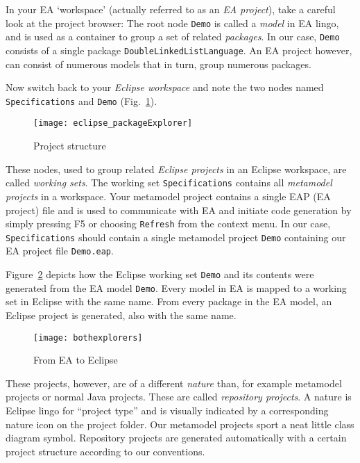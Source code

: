 In your EA `workspace' (actually referred to as an \emph{EA project}), take a careful  look at the project browser:  The root node \texttt{Demo} is called a
\emph{model} in EA lingo, and is used as a container to group a set of related \emph{packages}. In our case, \texttt{Demo}  consists of a single package
\texttt{DoubleLinkedListLanguage}. An EA project however, can consist of numerous models that in turn, group numerous packages.

Now switch back to your \emph{Eclipse workspace} and note the two nodes named \texttt{Spe\-ci\-fi\-ca\-tions} and \texttt{Demo} (Fig.~\ref{fig_eclipsePS}).

\begin{figure}[htbp]
    \centering
    \texttt{[image: eclipse\_packageExplorer]}
    \caption{Project structure}
    \label{fig_eclipsePS}
 \end{figure}


These nodes, used to group related \emph{Eclipse projects} in an Eclipse workspace, are called \emph{working sets}. The working set
\texttt{Spe\-ci\-fi\-ca\-tions} contains all \emph{metamodel projects} in a  workspace. Your metamodel project contains a single EAP (EA project) file and is
used to communicate with EA and initiate code generation by simply pressing F5 or choosing \texttt{Refresh} from the context menu.
In our case, \texttt{Specifications} should contain a single metamodel project \texttt{Demo} containing our EA project file  \texttt{Demo.eap}.
 
Figure~\ref{fig_fromEAtoEclipse} depicts how the Eclipse working set \texttt{Demo} and its contents were generated from the EA model \texttt{Demo}. Every model
in EA is mapped to a working set in Eclipse with the same name. From every package in the EA model, an Eclipse project is generated, also with the same name.

\begin{figure}[htbp]
    \centering
  \texttt{[image: bothexplorers]}
    \caption{From EA to Eclipse}
    \label{fig_fromEAtoEclipse}
\end{figure}

These projects, however, are of a different \emph{nature} than, for example metamodel projects or normal Java projects. These are called \emph{repository
projects}. A nature is Eclipse lingo for ``project type'' and is visually indicated by a corresponding nature icon on the project folder.
Our metamodel projects sport a neat little class diagram symbol. Repository projects are generated automatically with a certain project structure according to
our conventions.

